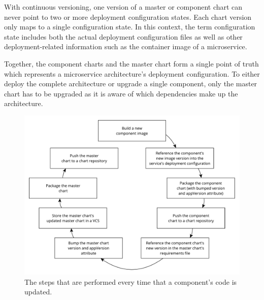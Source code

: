With continuous versioning, one version of a master or component chart can
never point to two or more deployment configuration states. Each chart version
only maps to a single configuration state. In this context, the term
configuration state includes both the actual deployment configuration files as
well as other deployment-related information such as the container image of a
microservice.

Together, the component charts and the master chart form a single point of
truth which represents a microservice architecture's deployment configuration.
To either deploy the complete architecture or upgrade a single component, only
the master chart has to be upgraded as it is aware of which dependencies make
up the architecture.

\begin{figure}[H]
\begin{center}
  \includegraphics[scale=0.6]{images/figures/cist_chart.pdf}
\end{center}
\caption{The steps that are performed every time that a component's code is
updated.}%
\label{fig:cist_chart}
\end{figure}

